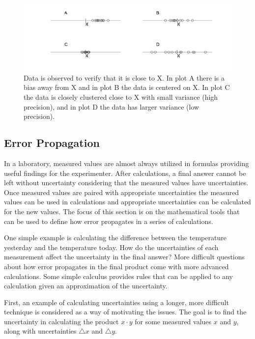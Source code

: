 \documentclass[12pt]{article}
\begin{document}
\begin{figure}[tb]
  \centerline{\includegraphics[width=4.5in]{bias}}
  \caption{Data is observed to verify that it is close to X. In plot A
    there is a bias away from X and in plot B the data is centered on
    X. In plot C the data is closely clustered close to X with small
    variance (high precision), and in plot D the data has larger
    variance (low precision).}
  \label{fig:biasPrecision}
\end{figure}


\subsection{Error Propagation}

In a laboratory, measured values are almost always utilized in
formulas providing useful findings for the experimenter.  After
calculations, a final answer cannot be left without uncertainty
considering that the measured values have uncertainties.  Once
measured values are paired with appropriate uncertainties the measured
values can be used in calculations and appropriate uncertainties can
be calculated for the new values.  The focus of this section is on the
mathematical tools that can be used to define how error propagates in
a series of calculations.
  
One simple example is calculating the difference between the
temperature yesterday and the temperature today.  How do the
uncertainties of each measurement affect the uncertainty in the final
answer?  More difficult questions about how error propagates in the
final product come with more advanced calculations.  Some simple
calculus provides rules that can be applied to any calculation given
an approximation of the uncertainty.

First, an example of calculating uncertainties using a longer, more
difficult technique is considered as a way of motivating the issues.
The goal is to find the uncertainty in calculating the product $x
\cdot y$ for some measured values $x$ and $y$, along with
uncertainties $\triangle{x}$ and $\triangle{y}$.  
\end{document}
